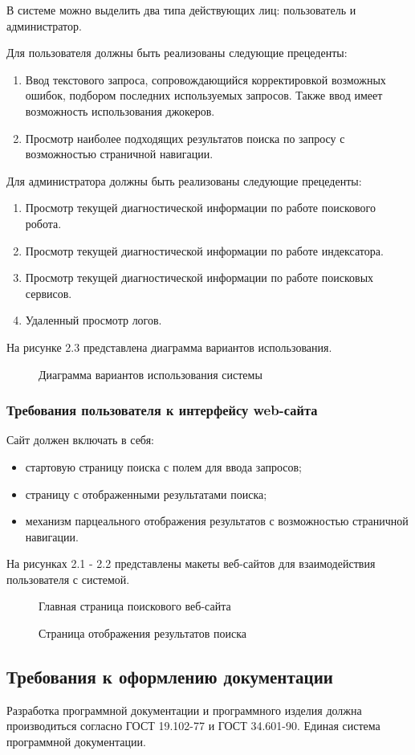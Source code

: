 В системе можно выделить два типа действующих лиц: пользователь и администратор. 

Для пользователя должны быть реализованы следующие прецеденты:
\begin{enumerate}
\item Ввод текстового запроса, сопровождающийся корректировкой возможных ошибок, подбором последних используемых запросов. Также ввод имеет возможность использования джокеров.
\item Просмотр наиболее подходящих результатов поиска по запросу с возможностью страничной навигации.
\end{enumerate}

Для администратора должны быть реализованы следующие прецеденты:
\begin{enumerate}
\item Просмотр текущей диагностической информации по работе поискового робота.
\item Просмотр текущей диагностической информации по работе индексатора.
\item Просмотр текущей диагностической информации по работе  поисковых сервисов.
\item Удаленный просмотр логов.
\end{enumerate}

На рисунке 2.3 представлена диаграмма вариантов использования.

\begin{figure}
\caption{Диаграмма вариантов использования системы}
\label{diagram_usecases:image}
\end{figure}

\subsubsection{Требования пользователя к интерфейсу web-сайта}

Сайт должен включать в себя:
\begin{itemize}
	\item стартовую страницу поиска с полем для ввода запросов;
	\item страницу с отображенными результатами поиска;
	\item механизм парцеального отображения результатов с возможностью страничной навигации.
\end{itemize}

На рисунках 2.1 - 2.2 представлены макеты веб-сайтов для взаимодействия пользователя с системой.
\begin{figure}
\caption{Главная страница поискового веб-сайта}
\label{site_main:image}
\end{figure}
\begin{figure}
\caption{Страница отображения результатов поиска}
\label{site_search:image}
\end{figure}


\subsection{Требования к оформлению документации}

Разработка программной документации и программного изделия должна производиться согласно ГОСТ 19.102-77 и ГОСТ 34.601-90. Единая система программной документации.
